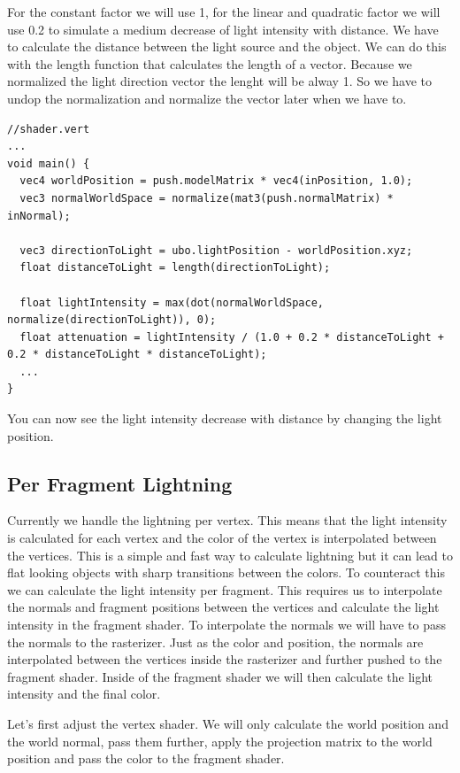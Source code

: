 \documentclass[12pt]{report} \usepackage{preamble}
\begin{document}
For the constant factor we will use 1, for the linear and quadratic factor we will use 0.2 to simulate a medium decrease of light intensity with distance.
We have to calculate the distance between the light source and the object. We can do this with the length function that calculates the length of a vector.
Because we normalized the light direction vector the lenght will be alway 1. So we have to undop the normalization and normalize the vector later when we have to.

\begin{lstlisting}[Language=C++]
//shader.vert
...
void main() {
  vec4 worldPosition = push.modelMatrix * vec4(inPosition, 1.0);
  vec3 normalWorldSpace = normalize(mat3(push.normalMatrix) * inNormal);

  vec3 directionToLight = ubo.lightPosition - worldPosition.xyz;
  float distanceToLight = length(directionToLight);

  float lightIntensity = max(dot(normalWorldSpace, normalize(directionToLight)), 0);
  float attenuation = lightIntensity / (1.0 + 0.2 * distanceToLight + 0.2 * distanceToLight * distanceToLight);
  ...
}
\end{lstlisting}

You can now see the light intensity decrease with distance by changing the light position.

\subsection{Per Fragment Lightning}

Currently we handle the lightning per vertex. This means that the light intensity is calculated for each vertex and the color of the vertex is interpolated between the vertices.
This is a simple and fast way to calculate lightning but it can lead to flat looking objects with sharp transitions between the colors.
To counteract this we can calculate the light intensity per fragment. This requires us to interpolate the normals and fragment positions between the vertices and calculate the light intensity in the fragment shader.
To interpolate the normals we will have to pass the normals to the rasterizer. Just as the color and position,
the normals are interpolated between the vertices inside the rasterizer and further pushed to the fragment shader.
Inside of the fragment shader we will then calculate the light intensity and the final color.

Let's first adjust the vertex shader. We will only calculate the world position and the world normal, pass them further, apply the projection matrix to the world position and pass the color to the fragment shader.
\end{document}

